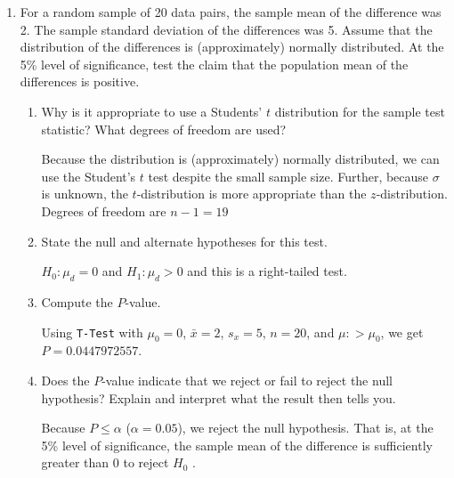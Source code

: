 \documentclass{article}
\newcommand{\answer}[1]{\color{white}#1}
\begin{document}
\begin{enumerate}

\item For a random sample of 20 data pairs, the sample mean of the difference was 2. The sample standard deviation of the differences was 5. Assume that the distribution of the differences is (approximately) normally distributed. At the 5\% level of significance, test the claim that the population mean of the differences is positive.
	\begin{enumerate}
	\item Why is it appropriate to use a Students' $t$ distribution for the sample test statistic?   What degrees of freedom are used? 
	
	{\answer Because the distribution is (approximately) normally distributed, we can use the Student's $t$ test despite the small sample size. Further, because $\sigma$ is unknown, the $t$-distribution is more appropriate than the $z$-distribution.  
	Degrees of freedom are $n-1 = 19$} 
	 
	\vfill
	
	\item State the null and alternate hypotheses for this test.  
	
	{\answer $H_0 : \mu_d = 0$  and $H_1: \mu_d > 0$ and this is a right-tailed test.} 
	 
	\vfill
	
	\item Compute the $P$-value.  
	
	{\answer Using \texttt{T-Test} with $\mu_0 = 0$, $\bar{x} = 2$, $s_x = 5$, $n = 20 $, and $\mu: > \mu_0$, we get $P = 0.0447972557$.} 
	 
	\vfill
	
	\item Does the $P$-value indicate that we reject or fail to reject the null hypothesis? Explain and interpret what the result then tells you.  
	
	{\answer Because $P\leq \alpha$ ($\alpha= 0.05$), we reject the null hypothesis. That is, at the 5\% level of significance, the sample mean of the difference is sufficiently greater than $0$ to reject $H_0$ .}
	
	\vfill
	\end{enumerate}
	
\newpage


\end{enumerate}
\end{document}
